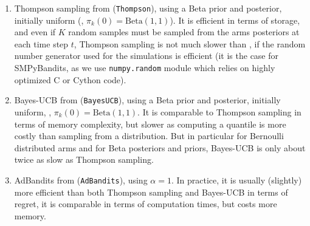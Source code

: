 \begin{enumerate}
    \item
    Thompson sampling from \cite{Kaufmann12Thompson} (\texttt{Thompson}), using a Beta prior and posterior, initially uniform (\ie, $\pi_k(0)=\mathrm{Beta}(1,1)$).
    It is efficient in terms of storage, and even if $K$ random samples must be sampled from the arms posteriors at each time step $t$, Thompson sampling is not much slower than \UCB, if the random number generator used for the simulations is efficient (it is the case for SMPyBandits, as we use \texttt{numpy.random} module which relies on highly optimized C or Cython code).

    \item
    Bayes-UCB from \cite{Kaufmann12BUCB} (\texttt{BayesUCB}), using a Beta prior and posterior, initially uniform, \ie, $\pi_k(0)=\mathrm{Beta}(1,1)$.
    It is comparable to Thompson sampling in terms of memory complexity, but slower as computing a quantile is more costly than sampling from a distribution.
    But in particular for Bernoulli distributed arms and for Beta posteriors and priors, Bayes-UCB is only about twice as slow as Thompson sampling.

    \item
    AdBandits from \cite{Truzzi13} (\texttt{AdBandits}), using $\alpha=1$.
    In practice, it is usually (slightly) more efficient than both Thompson sampling and Bayes-UCB in terms of regret, it is comparable in terms of computation times, but costs more memory.


\end{enumerate}
